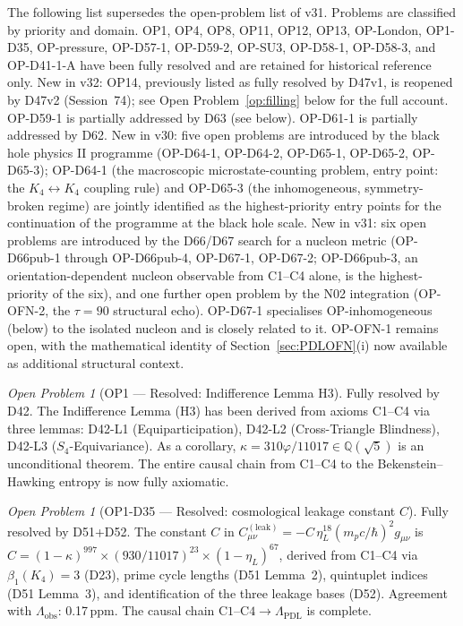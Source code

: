 \documentclass[11pt,a4paper]{article}
\theoremstyle{plain}
\theoremstyle{definition}
\theoremstyle{remark}
\newtheorem{openproblem}[theorem]{Open Problem}
\begin{document}
The following list supersedes the open-problem list of v31. Problems are classified by priority and domain. OP1, OP4, OP8, OP11, OP12, OP13, OP-London, OP1-D35, OP-pressure, OP-D57-1, OP-D59-2, OP-SU3, OP-D58-1, OP-D58-3, and OP-D41-1-A have been fully resolved and are retained for historical reference only. \textcolor{negativered}{New in v32: OP14, previously listed as fully resolved by D47v1, is reopened by D47v2 (Session~74); see Open Problem~\ref{op:filling} below for the full account.} OP-D59-1 is partially addressed by D63 (see below). OP-D61-1 is partially addressed by D62. New in v30: five open problems are introduced by the black hole physics II programme (OP-D64-1, OP-D64-2, OP-D65-1, OP-D65-2, OP-D65-3); OP-D64-1 (the macroscopic microstate-counting problem, entry point: the $K_4\leftrightarrow K_4$ coupling rule) and OP-D65-3 (the inhomogeneous, symmetry-broken regime) are jointly identified as the highest-priority entry points for the continuation of the programme at the black hole scale. New in v31: six open problems are introduced by the D66/D67 search for a nucleon metric (OP-D66pub-1 through OP-D66pub-4, OP-D67-1, OP-D67-2; OP-D66pub-3, an orientation-dependent nucleon observable from C1--C4 alone, is the highest-priority of the six), and one further open problem by the N02 integration (OP-OFN-2, the $\tau=90$ structural echo). OP-D67-1 specialises OP-inhomogeneous (below) to the isolated nucleon and is closely related to it. OP-OFN-1 remains open, with the mathematical identity of Section~\ref{sec:PDLOFN}(i) now available as additional structural context.

\begin{openproblem}[OP1 --- Resolved: Indifference Lemma H3]
\label{op:H3}
\textcolor{proofblue}{Fully resolved by D42.} The Indifference Lemma (H3) has been derived from axioms C1--C4 via three lemmas: D42-L1 (Equiparticipation), D42-L2 (Cross-Triangle Blindness), D42-L3 ($S_4$-Equivariance). As a corollary, $\kappa=310\varphi/11017\in\mathbb{Q}(\sqrt{5})$ is an unconditional theorem. The entire causal chain from C1--C4 to the Bekenstein--Hawking entropy is now fully axiomatic.
\end{openproblem}

\begin{openproblem}[OP1-D35 --- Resolved: cosmological leakage constant $C$]
\label{op:leakconstant}
\textcolor{proofblue}{Fully resolved by D51+D52.} The constant $C$ in $C^{(\mathrm{leak})}_{\mu\nu}=-C\,\eta_L^{18}(m_p c/\hbar)^2 g_{\mu\nu}$ is $C=(1-\kappa)^{997}\times(930/11017)^{23}\times(1-\eta_L)^{67}$, derived from C1--C4 via $\beta_1(K_4)=3$ (D23), prime cycle lengths (D51 Lemma~2), quintuplet indices (D51 Lemma~3), and identification of the three leakage bases (D52). Agreement with $\Lambda_{\mathrm{obs}}$: 0.17\,ppm. The causal chain $\mathrm{C1\text{--}C4}\to\Lambda_{\mathrm{PDL}}$ is complete.
\end{openproblem}
\end{document}
